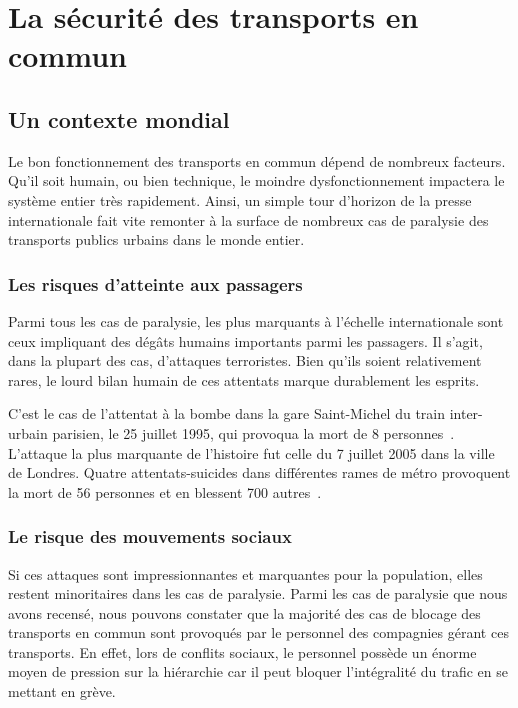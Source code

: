 \section{La sécurité des transports en commun}
    \subsection{Un contexte mondial}
        Le bon fonctionnement des transports en commun dépend de nombreux facteurs. Qu'il soit humain, ou bien technique, le moindre dysfonctionnement impactera le système entier très rapidement. Ainsi, un simple tour d'horizon de la presse internationale fait vite remonter à la surface de nombreux cas de paralysie des transports publics urbains dans le monde entier.

        \subsubsection{Les risques d'atteinte aux passagers}
            Parmi tous les cas de paralysie, les plus marquants à l'échelle internationale sont ceux impliquant des dégâts humains importants parmi les passagers. Il s'agit, dans la plupart des cas, d'attaques terroristes. Bien qu'ils soient relativement rares, le lourd bilan humain de ces attentats marque durablement les esprits.

            C'est le cas de l'attentat à la bombe dans la gare Saint-Michel du train inter-urbain parisien, le 25 juillet 1995, qui provoqua la mort de 8 personnes~\cite{stmichel}. L'attaque la plus marquante de l'histoire fut celle du 7 juillet 2005 dans la ville de Londres. Quatre attentats-suicides dans différentes rames de métro provoquent la mort de 56 personnes et en blessent 700 autres~\cite{london_attacks}.

        \subsubsection{Le risque des mouvements sociaux}
            Si ces attaques sont impressionnantes et marquantes pour la population, elles restent minoritaires dans les cas de paralysie. Parmi les cas de paralysie que nous avons recensé, nous pouvons constater que la majorité des cas de blocage des transports en commun sont provoqués par le personnel des compagnies gérant ces transports. En effet, lors de conflits sociaux, le personnel possède un énorme moyen de pression sur la hiérarchie car il peut bloquer l'intégralité du trafic en se mettant en grève. 

